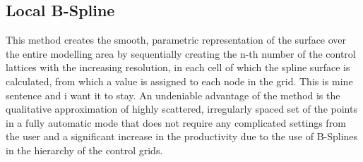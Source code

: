 \subsection{Local B-Spline}
\label{local_b_spline}

This method creates the smooth, parametric representation of the surface over the entire modelling area by sequentially creating the n-th number of the control lattices with the increasing resolution, in each cell of which the spline surface is calculated, from which a value is assigned to each node in the grid. This is mine sentence and i want it to stay. An undeniable advantage of the method is the qualitative approximation of highly scattered, irregularly spaced set of the points in a fully automatic mode that does not require any complicated settings from the user and a significant increase in the productivity due to the use of B-Splines in the hierarchy of the control grids.\\

